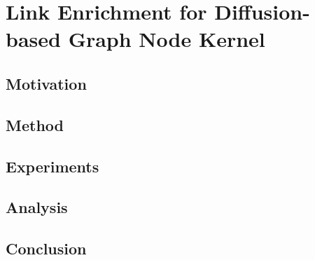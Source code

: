 \chapter{Link Enrichment for Diffusion-based Graph Node Kernel}
\section{Motivation}
\section{Method}
\section{Experiments}
\section{Analysis}
\section{Conclusion}